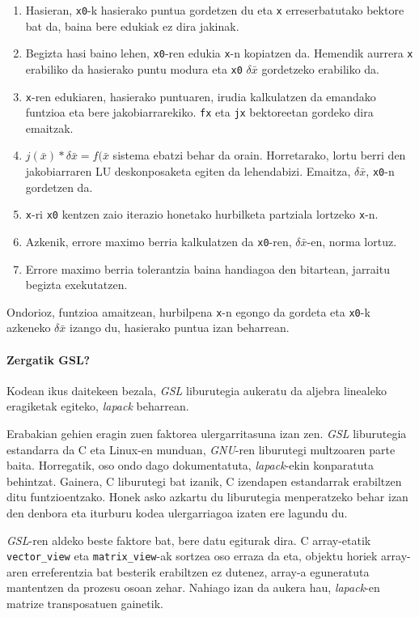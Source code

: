 \documentclass[10pt,a4paper,basque]{article}
\begin{document}
\begin{enumerate}
\item Hasieran, \verb|x0|-k hasierako puntua gordetzen du eta \verb|x| erreserbatutako bektore bat da, baina bere edukiak ez dira jakinak.
\item Begizta hasi baino lehen, \verb|x0|-ren edukia \verb|x|-n kopiatzen da. Hemendik aurrera \verb|x| erabiliko da hasierako puntu modura eta \verb|x0| $\delta \bar{x}$ gordetzeko erabiliko da.
\item \verb|x|-ren edukiaren, hasierako puntuaren, irudia kalkulatzen da emandako funtzioa eta bere jakobiarrarekiko. \verb|fx| eta \verb|jx| bektoreetan gordeko dira emaitzak.
\item $j(\bar{x}) * \delta \bar{x} = f(\bar{x}$ sistema ebatzi behar da orain. Horretarako, lortu berri den jakobiarraren LU deskonposaketa egiten da lehendabizi. Emaitza, $\delta \bar{x}$, \verb|x0|-n gordetzen da.
\item \verb|x|-ri \verb|x0| kentzen zaio iterazio honetako hurbilketa partziala lortzeko \verb|x|-n.
\item Azkenik, errore maximo berria kalkulatzen da \verb|x0|-ren, $\delta \bar{x}$-en, norma lortuz.
\item Errore maximo berria tolerantzia baina handiagoa den bitartean, jarraitu begizta exekutatzen.
\end{enumerate}

Ondorioz, funtzioa amaitzean, hurbilpena \verb|x|-n egongo da gordeta eta \verb|x0|-k azkeneko $\delta \bar{x}$ izango du, hasierako puntua izan beharrean.

\paragraph{Zergatik GSL?}

Kodean ikus daitekeen bezala, \emph{GSL} liburutegia aukeratu da aljebra linealeko eragiketak egiteko, \emph{lapack} beharrean.

Erabakian gehien eragin zuen faktorea ulergarritasuna izan zen. \emph{GSL} liburutegia estandarra da C eta Linux-en munduan, \emph{GNU}-ren liburutegi multzoaren parte baita. Horregatik, oso ondo dago dokumentatuta, \emph{lapack}-ekin konparatuta behintzat. Gainera, C liburutegi bat izanik, C izendapen estandarrak erabiltzen ditu funtzioentzako. Honek asko azkartu du liburutegia menperatzeko behar izan den denbora eta iturburu kodea ulergarriagoa izaten ere lagundu du.

\emph{GSL}-ren aldeko beste faktore bat, bere datu egiturak dira. C array-etatik \verb|vector_view| eta \verb|matrix_view|-ak sortzea oso erraza da eta, objektu horiek array-aren erreferentzia bat besterik erabiltzen ez dutenez, array-a eguneratuta mantentzen da prozesu osoan zehar. Nahiago izan da aukera hau, \emph{lapack}-en matrize transposatuen gainetik.
\end{document}
